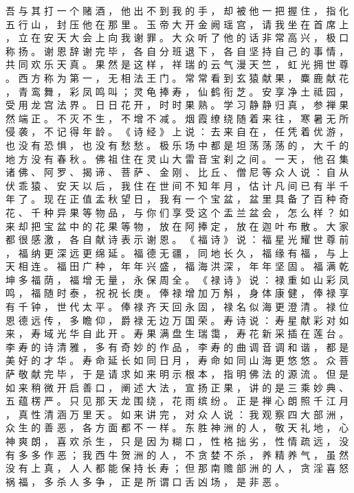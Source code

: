 {吾 与 其 打 一 个 赌 酒 ， 他 出 不 到 我 的 手 ， 却 被 他 一 把 握 住 ， 指 化 五 行 山 ， 封 压 他 在 那 里 。
玉 帝 大 开 金 阙 瑶 宫 ， 请 我 坐 在 首 席 上 ， 立 在 安 天 大 会 上 向 我 谢 罪 。
大 众 听 了 他 的 话 非 常 高 兴 ， 极 口 称 扬 。
谢 恩 辞 谢 完 毕 ， 各 自 分 班 退 下 ， 各 自 坚 持 自 己 的 事 情 ， 共 同 欢 乐 天 真 。
果 然 是 这 样 ， 祥 瑞 的 云 气 漫 天 竺 ， 虹 光 拥 世 尊 。
西 方 称 为 第 一 ， 无 相 法 王 门 。
常 常 看 到 玄 猿 献 果 ， 麋 鹿 献 花 ， 青 鸾 舞 ， 彩 凤 鸣 叫 ； 灵 龟 捧 寿 ， 仙 鹤 衔 芝 。
安 享 净 土 祗 园 ， 受 用 龙 宫 法 界 。
日 日 花 开 ， 时 时 果 熟 。
学 习 静 静 归 真 ， 参 禅 果 然 端 正 。
不 灭 不 生 ， 不 增 不 减 。
烟 霞 缭 绕 随 着 来 往 ， 寒 暑 无 所 侵 袭 ， 不 记 得 年 龄 。
《 诗 经 》 上 说 ： 去 来 自 在 ， 任 凭 着 优 游 ， 也 没 有 恐 惧 ， 也 没 有 愁 愁 。
极 乐 场 中 都 是 坦 荡 荡 荡 的 ， 大 千 的 地 方 没 有 春 秋 。
佛 祖 住 在 灵 山 大 雷 音 宝 刹 之 间 。
一 天 ， 他 召 集 诸 佛 、 阿 罗 、 揭 谛 、 菩 萨 、 金 刚 、 比 丘 、 僧 尼 等 众 人 说 ： 自 从 伏 乖 猿 、 安 天 以 后 ， 我 住 在 世 间 不 知 年 月 ， 估 计 凡 间 已 有 半 千 年 了 。
现 在 正 值 孟 秋 望 日 ， 我 有 一 个 宝 盆 ， 盆 里 具 备 了 百 种 奇 花 、 千 种 异 果 等 物 品 ， 与 你 们 享 受 这 个 盂 兰 盆 会 ， 怎 么 样 ？
如 来 却 把 宝 盆 中 的 花 果 等 物 ， 放 在 阿 捧 定 ， 放 在 迦 叶 布 散 。
大 家 都 很 感 激 ， 各 自 献 诗 表 示 谢 恩 。
《 福 诗 》 说 ： 福 星 光 耀 世 尊 前 ， 福 纳 更 深 远 更 绵 延 。
福 德 无 疆 ， 同 地 长 久 ， 福 缘 有 福 ， 与 上 天 相 连 。
福 田 广 种 ， 年 年 兴 盛 ， 福 海 洪 深 ， 年 年 坚 固 。
福 满 乾 坤 多 福 荫 ， 福 增 无 量 ， 永 保 周 全 。
《 禄 诗 》 说 ： 禄 重 如 山 彩 凤 鸣 ， 福 随 时 泰 ， 祝 祝 长 庚 。
俸 禄 增 加 万 斛 ， 身 体 康 健 ， 俸 禄 享 有 千 钟 ， 世 代 太 平 。
俸 禄 齐 天 回 永 固 ， 禄 名 似 海 更 澄 清 。
禄 位 恩 德 远 传 ， 多 瞻 仰 ， 爵 禄 无 边 万 国 荣 。
寿 诗 说 ： 寿 星 献 彩 对 如 来 ， 寿 域 光 华 自 此 开 。
寿 果 满 盘 生 瑞 霭 ， 寿 花 新 采 插 在 莲 台 。
李 寿 的 诗 清 雅 ， 多 有 奇 妙 的 作 品 ， 李 寿 的 曲 调 音 调 和 谐 ， 都 是 美 好 的 才 华 。
寿 命 延 长 如 同 日 月 ， 寿 命 如 同 山 海 更 悠 悠 。
众 菩 萨 敬 献 完 毕 ， 于 是 请 求 如 来 明 示 根 本 ， 指 明 佛 法 的 源 流 。
但 是 如 来 稍 微 开 启 善 口 ， 阐 述 大 法 ， 宣 扬 正 果 ， 讲 的 是 三 乘 妙 典 、 五 蕴 楞 严 。
只 见 那 天 龙 围 绕 ， 花 雨 缤 纷 。
正 是 禅 心 朗 照 千 江 月 ， 真 性 清 涵 万 里 天 。
如 来 讲 完 ， 对 众 人 说 ： 我 观 察 四 大 部 洲 ， 众 生 的 善 恶 ， 各 方 面 都 不 一 样 。 东 胜 神 洲 的 人 ， 敬 天 礼 地 ， 心 神 爽 朗 ， 喜 欢 杀 生 ， 只 是 因 为 糊 口 ， 性 格 拙 劣 ， 性 情 疏 远 ， 没 有 多 多 作 恶 ； 我 西 牛 贺 洲 的 人 ， 不 贪 婪 不 杀 ， 养 精 养 气 ， 虽 然 没 有 上 真 ， 人 人 都 能 保 持 长 寿 ； 但 那 南 赡 部 洲 的 人 ， 贪 淫 喜 怒 祸 福 ， 多 杀 人 多 争 ， 正 是 所 谓 口 舌 凶 场 ， 是 非 恶 。
}
